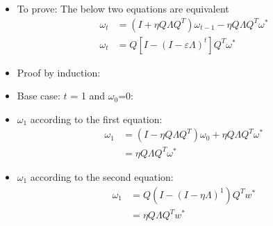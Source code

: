 \begin{frame}
\end{frame}

\begin{frame}
	\begin{overlayarea}{\textwidth}{\textheight}
		\begin{itemize}
			\item<1-> To prove: The below two equations are equivalent
				\begin{align*}
					\omega_t & = (I+\eta Q \Lambda Q^{T} )\omega_{t-1}-\eta Q \Lambda Q^{T} \omega^{*}\\
					\omega_t & = Q[I-(I-\varepsilon \Lambda)^{t}]Q^{T}\omega^{*} 
				\end{align*}
			\item<2-> Proof by induction:
			\item<3-> Base case: $t$ = 1 and $\omega_0$=0:
			\item<4-> $\omega_1$ according to the first equation:
				\begin{align*}
					\omega_1 & = (I - \eta Q\Lambda Q^T) \omega_0 + \eta Q\Lambda Q^T \omega^* \\
					         & = \eta Q\Lambda Q^T \omega^*
				\end{align*}
			\item<5-> $\omega_1$ according to the second equation:
                \begin{align*}
					\omega_1 & = Q(I - (I - \eta \Lambda)^1)Q^T w^*\\
                  			 & = \eta Q\Lambda Q^T w^*
                \end{align*}
        \end{itemize}
	\end{overlayarea}
\end{frame}


